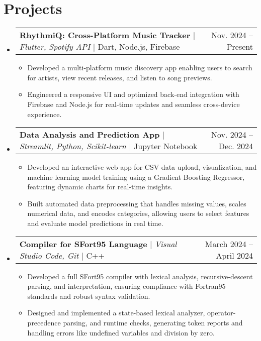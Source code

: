 \documentclass[letterpaper,11pt]{article}
\makeatletter
\newcommand{\resumeItem}[1]{\item\small{{#1 \vspace{-2pt}}}}
\newcommand{\resumeProjectHeading}[2]{
    \item
    \begin{tabular*}{0.97\textwidth}{l@{\extracolsep{\fill}}r}
      \small#1 & #2 \\
    \end{tabular*}\vspace{-7pt}
}
\newcommand{\resumeSubHeadingListStart}{\begin{itemize}[leftmargin=0.15in, label={}]}
\newcommand{\resumeSubHeadingListEnd}{\end{itemize}}
\newcommand{\resumeItemListStart}{\begin{itemize}}
\newcommand{\resumeItemListEnd}{\end{itemize}\vspace{-5pt}}
\makeatother
\begin{document}
\section{Projects}
    \resumeSubHeadingListStart
      \resumeProjectHeading
          {\textbf{RhythmiQ: Cross-Platform Music Tracker} $|$ \emph{Flutter, Spotify API} $|$ Dart, Node.js, Firebase} {Nov. 2024 – Present}
          \resumeItemListStart
            \resumeItem{Developed a multi-platform music discovery app enabling users to search for artists, view recent releases, and listen to song previews.}
            \resumeItem{Engineered a responsive UI and optimized back-end integration with Firebase and Node.js for real-time updates and seamless cross-device experience.}
          \resumeItemListEnd
      \resumeProjectHeading
          {\textbf{Data Analysis and Prediction App} $|$ \emph{Streamlit, Python, Scikit-learn} $|$ Jupyter Notebook} {Nov. 2024 – Dec. 2024}
          \resumeItemListStart
            \resumeItem{Developed an interactive web app for CSV data upload, visualization, and machine learning model training using a Gradient Boosting Regressor, featuring dynamic charts for real-time insights.}
            \resumeItem{Built automated data preprocessing that handles missing values, scales numerical data, and encodes categories, allowing users to select features and evaluate model predictions in real time.}
          \resumeItemListEnd
      \resumeProjectHeading
          {\textbf{Compiler for SFort95 Language} $|$ \emph{Visual Studio Code, Git} $|$ C++} {March 2024 – April 2024}
          \resumeItemListStart
            \resumeItem{Developed a full SFort95 compiler with lexical analysis, recursive-descent parsing, and interpretation, ensuring compliance with Fortran95 standards and robust syntax validation.}
            \resumeItem{Designed and implemented a state-based lexical analyzer, operator-precedence parsing, and runtime checks, generating token reports and handling errors like undefined variables and division by zero.}
          \resumeItemListEnd
    \resumeSubHeadingListEnd
\end{document}
